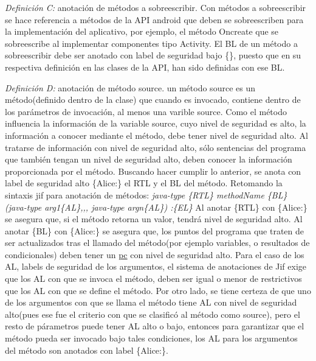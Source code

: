 \textit{Definición C:} anotación de métodos a sobreescribir.\newline
Con métodos a sobreescribir se hace referencia a métodos de la API android que
deben se sobreescriben para la implementación del aplicativo, por ejemplo, el
método Oncreate que se sobreescribe al implementar componentes tipo
Activity.\newline 
El BL de un método a sobreescribir debe ser anotado con label de seguridad bajo
\{\}, puesto que en su respectiva definición en las clases de la API, han sido
definidas con ese BL.

\textit{Definición D:} anotación de método source.\newline 
un método source es un método(definido dentro de la clase)
que cuando es invocado, contiene dentro de los parámetros de invocación, al menos
una varible source. Como el método influencia la información de la variable
source, cuyo nivel de seguridad es alto, la información a conocer mediante el
método, debe tener nivel de seguridad alto.\newline
Al tratarse de información con nivel de seguridad alto, sólo sentencias del
programa que también tengan un nivel de seguridad alto, deben conocer la
información proporcionada por el método.\newline 
Buscando hacer cumplir lo anterior, se anota con label de seguridad alto
\{Alice:\} el RTL y el BL del método.
Retomando la sintaxis jif para anotación de métodos:\newline \emph{
java-type \{RTL\} methodName \{BL\} (java-type arg1\{AL\},,, java-type argn\{AL\}) :\{EL\} }\newline
Al anotar \{RTL\} con \{Alice:\} se asegura que, si el método retorna un valor,
tendrá nivel de seguridad alto.\newline
Al anotar \{BL\} con \{Alice:\} se asegura que, los puntos del programa que
traten de ser actualizados tras el llamado del método(por ejemplo variables, o
resultados de condicionales) deben tener un \underline{pc} con nivel de
seguridad alto.\newline
Para el caso de los AL, labels de seguridad de los argumentos, el sistema de
anotaciones de Jif exige que los AL con que se invoca el método, deben ser igual
o menor de restrictivos que los AL con que se define el método. 
Por otro lado, se tiene certeza de que uno de los argumentos con que se llama el
método tiene AL con nivel de seguridad alto(pues ese fue el criterio con que
se clasificó al método como source), pero el resto de párametros puede tener AL
alto o bajo, entonces para garantizar que el método pueda ser invocado bajo
tales condiciones, los AL para los argumentos del método son anotados con label
\{Alice:\}.\newline

